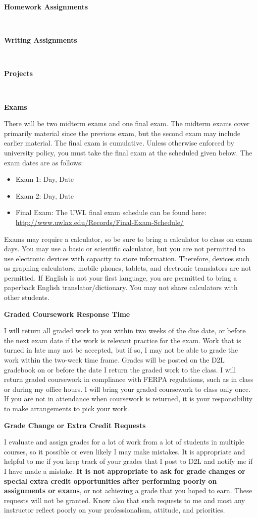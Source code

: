 \documentclass[10pt]{article}
\newcommand{\bulurl}[1]{\url{#1}}
\newcommand{\bi}{\begin{itemize}}
\newcommand{\ei}{\end{itemize}}
\newcommand{\toprule}{\par\vspace*{5pt}\noindent{\hrule\hfill}\par\vspace*{1pt}}
\newcommand{\botrule}{\par\noindent{\hrule\hfill}\par}
\begin{document}
\botrule \textbf{Homework Assignments} \toprule
\ \\

\botrule \textbf{Writing Assignments} \toprule
\ \\

\botrule \textbf{Projects} \toprule
\ \\

\botrule \textbf{Exams} \toprule
There will be two midterm exams and one final exam.  The midterm exams cover primarily material since the previous exam, but the second exam may include earlier material.  The final exam is cumulative.  Unless otherwise enforced by university policy, you must take the final exam at the scheduled given below.  The exam dates are as follows: 
\bi
\item Exam 1: Day, Date
\item Exam 2: Day, Date
\item Final Exam: 
The UWL final exam schedule can be found here:\\ \bulurl{http://www.uwlax.edu/Records/Final-Exam-Schedule/}
\ei

Exams may require a calculator, so be sure to bring a calculator to class on exam days.  You may use a basic or scientific calculator, but you are not permitted to use electronic devices with capacity to store information.  Therefore, devices such as graphing calculators, mobile phones, tablets, and electronic translators are not permitted.  If English is not your first language, you are permitted to bring a paperback English translator/dictionary.  You may not share calculators with other students. \\

\botrule \textbf{Graded Coursework Response Time} \toprule
I will return all graded work to you within two weeks of the due date, or before the next exam date if the work is relevant practice for the exam.  Work that is turned in late may not be accepted, but if so, I may not be able to grade the work within the two-week time frame.  Grades will be posted on the D2L gradebook on or before the date I return the graded work to the class.  I will return graded coursework in compliance with FERPA regulations, such as in class or during my office hours.  I will bring your graded coursework to class only once.  If you are not in attendance when coursework is returned, it is your responsibility to make arrangements to pick your work.\\

\botrule \textbf{Grade Change or Extra Credit Requests} \toprule 
I evaluate and assign grades for a lot of work from a lot of students in multiple courses, so it possible or even likely I may make mistakes.  It is appropriate and helpful to me if you keep track of your grades that I post to D2L and notify me if I have made a mistake.  \textbf{It is not appropriate to ask for grade changes or special extra credit opportunities after performing poorly on assignments or exams}, or not achieving a grade that you hoped to earn.  These requests will not be granted.  Know also that such requests to me and most any instructor reflect poorly on your professionalism, attitude, and priorities.\\
\end{document}
